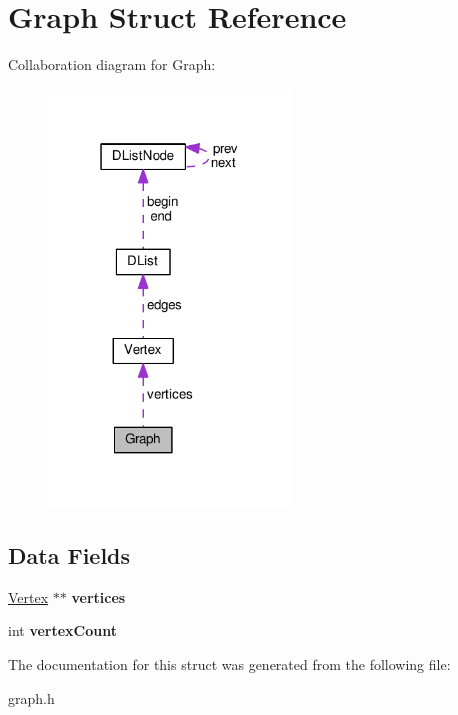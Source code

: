 \hypertarget{structGraph}{}\section{Graph Struct Reference}
\label{structGraph}


Collaboration diagram for Graph\+:\nopagebreak
\begin{figure}[H]
\begin{center}
\leavevmode
\includegraphics[width=183pt]{structGraph__coll__graph}
\end{center}
\end{figure}
\subsection*{Data Fields}
\begin{DoxyCompactItemize}
\item 
\hyperlink{structVertex}{Vertex} $\ast$$\ast$ {\bfseries vertices}\hypertarget{structGraph_a78b1f05b8d7d75efa2da1688f7ab4e85}{}\label{structGraph_a78b1f05b8d7d75efa2da1688f7ab4e85}

\item 
int {\bfseries vertex\+Count}\hypertarget{structGraph_aa61a470b538b8c5836ae3f3e6a4dc438}{}\label{structGraph_aa61a470b538b8c5836ae3f3e6a4dc438}

\end{DoxyCompactItemize}


The documentation for this struct was generated from the following file\+:\begin{DoxyCompactItemize}
\item 
graph.\+h\end{DoxyCompactItemize}
